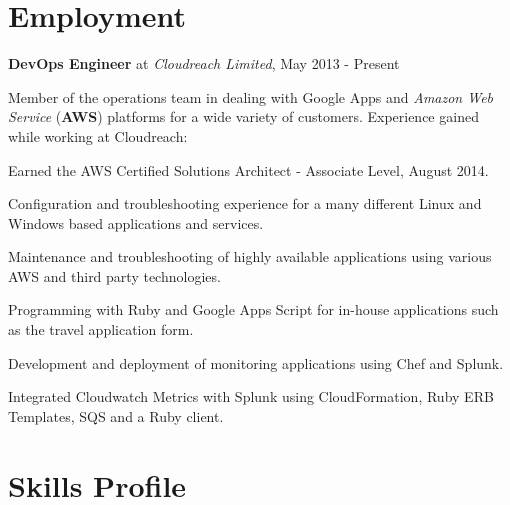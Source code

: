 \documentclass[11pt,a4paper]{article}
\renewenvironment{itemize}{
  \begin{list}{}{
    \setlength{\leftmargin}{1em}
    \setlength{\itemsep}{0.25em}
    \setlength{\parskip}{0pt}
    \setlength{\parsep}{0.25em}
    \renewcommand{\labelitemi}{$\bullet$}
  }
}{
  \end{list}
}
\begin{document}
\section*{Employment}

\begin{itemize}
    \item \textbf{DevOps Engineer} at \emph{Cloudreach Limited}, May 2013 - Present

    Member of the operations team in dealing with Google Apps and \emph{Amazon Web Service} (\textbf{AWS}) platforms for a wide variety of customers. 
    Experience gained while working at Cloudreach:
    \begin{itemize}
      \item Earned the AWS Certified Solutions Architect - Associate Level, August 2014.
      \item Configuration and troubleshooting experience for a many different Linux and Windows based applications and services.
      \item Maintenance and troubleshooting of highly available applications using various AWS and third party technologies.
      \item Programming with Ruby and Google Apps Script for in-house applications such as the travel application form.
      \item Development and deployment of monitoring applications using Chef and Splunk.
      \item Integrated Cloudwatch Metrics with Splunk using CloudFormation, Ruby ERB Templates, SQS and a Ruby client.
    \end{itemize}
\end{itemize}

\section*{Skills Profile}
\end{document}
